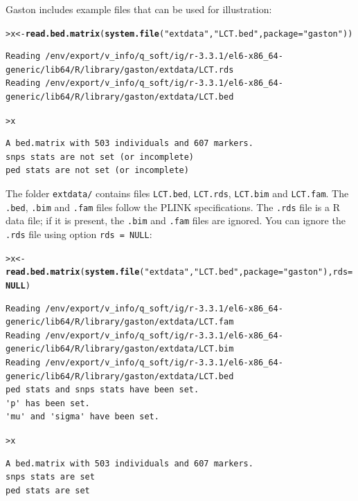 \documentclass{article}\usepackage[]{graphicx}\usepackage[]{color}
\makeatletter
\newcommand{\hlstr}[1]{\textcolor[rgb]{0.192,0.494,0.8}{#1}}%
\newcommand{\hlstd}[1]{\textcolor[rgb]{0.345,0.345,0.345}{#1}}%
\newcommand{\hlkwa}[1]{\textcolor[rgb]{0.161,0.373,0.58}{\textbf{#1}}}%
\newcommand{\hlkwb}[1]{\textcolor[rgb]{0.69,0.353,0.396}{#1}}%
\newcommand{\hlkwc}[1]{\textcolor[rgb]{0.333,0.667,0.333}{#1}}%
\newcommand{\hlkwd}[1]{\textcolor[rgb]{0.737,0.353,0.396}{\textbf{#1}}}%
\newenvironment{kframe}{%
 \def\at@end@of@kframe{}%
 \ifinner\ifhmode%
  \def\at@end@of@kframe{\end{minipage}}%
  \begin{minipage}{\columnwidth}%
 \fi\fi%
 \def\FrameCommand##1{\hskip\@totalleftmargin \hskip-\fboxsep
 \colorbox{shadecolor}{##1}\hskip-\fboxsep
     \hskip-\linewidth \hskip-\@totalleftmargin \hskip\columnwidth}%
 \MakeFramed {\advance\hsize-\width
   \@totalleftmargin\z@ \linewidth\hsize
   \@setminipage}}%
 {\par\unskip\endMakeFramed%
 \at@end@of@kframe}
\newenvironment{knitrout}{}{} %
\makeatother
\begin{document}
  Gaston includes example files that can be used for illustration:

\begin{knitrout}
\color{fgcolor}\begin{kframe}
\begin{alltt}
\hlstd{> }\hlstd{x} \hlkwb{<-} \hlkwd{read.bed.matrix}\hlstd{(} \hlkwd{system.file}\hlstd{(}\hlstr{"extdata"}\hlstd{,} \hlstr{"LCT.bed"}\hlstd{,} \hlkwc{package}\hlstd{=}\hlstr{"gaston"}\hlstd{) )}
\end{alltt}
\begin{verbatim}
Reading /env/export/v_info/q_soft/ig/r-3.3.1/el6-x86_64-generic/lib64/R/library/gaston/extdata/LCT.rds 
Reading /env/export/v_info/q_soft/ig/r-3.3.1/el6-x86_64-generic/lib64/R/library/gaston/extdata/LCT.bed 
\end{verbatim}
\begin{alltt}
\hlstd{> }\hlstd{x}
\end{alltt}
\begin{verbatim}
A bed.matrix with 503 individuals and 607 markers.
snps stats are not set (or incomplete)
ped stats are not set (or incomplete)
\end{verbatim}
\end{kframe}
\end{knitrout}
  
  The folder \verb!extdata/! contains files \verb!LCT.bed!, \verb!LCT.rds!,
  \verb!LCT.bim! and \verb!LCT.fam!. The \verb!.bed!, \verb!.bim! and \verb!.fam! files follow the
  PLINK specifications. The \verb!.rds! file is a R data file; if it is present, the
  \verb!.bim! and \verb!.fam! files are ignored. You can ignore the
  \verb!.rds! file using option \verb!rds = NULL!:

\begin{knitrout}
\color{fgcolor}\begin{kframe}
\begin{alltt}
\hlstd{> }\hlstd{x} \hlkwb{<-} \hlkwd{read.bed.matrix}\hlstd{(} \hlkwd{system.file}\hlstd{(}\hlstr{"extdata"}\hlstd{,} \hlstr{"LCT.bed"}\hlstd{,} \hlkwc{package}\hlstd{=}\hlstr{"gaston"}\hlstd{),} \hlkwc{rds} \hlstd{=} \hlkwa{NULL} \hlstd{)}
\end{alltt}
\begin{verbatim}
Reading /env/export/v_info/q_soft/ig/r-3.3.1/el6-x86_64-generic/lib64/R/library/gaston/extdata/LCT.fam 
Reading /env/export/v_info/q_soft/ig/r-3.3.1/el6-x86_64-generic/lib64/R/library/gaston/extdata/LCT.bim 
Reading /env/export/v_info/q_soft/ig/r-3.3.1/el6-x86_64-generic/lib64/R/library/gaston/extdata/LCT.bed 
ped stats and snps stats have been set. 
'p' has been set. 
'mu' and 'sigma' have been set.
\end{verbatim}
\begin{alltt}
\hlstd{> }\hlstd{x}
\end{alltt}
\begin{verbatim}
A bed.matrix with 503 individuals and 607 markers.
snps stats are set
ped stats are set
\end{verbatim}
\end{kframe}
\end{knitrout}
\end{document}
